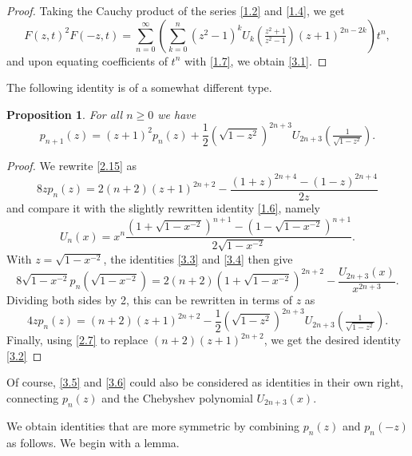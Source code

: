 \documentclass{amsart}
\theoremstyle{plain}
\newtheorem{proposition}[theorem]{Proposition}
\numberwithin{equation}{section}
\begin{document}
\begin{proof}
Taking the Cauchy product of the series \eqref{1.2} and \eqref{1.4}, we get
\[
F(z,t)^2F(-z,t)=\sum_{n=0}^\infty\left(\sum_{k=0}^n(z^2-1)^k
U_k(\tfrac{z^2+1}{z^2-1})(z+1)^{2n-2k}\right)t^n,
\]
and upon equating coefficients of $t^n$ with \eqref{1.7}, we obtain \eqref{3.1}.
\end{proof}

The following identity is of a somewhat different type.

\begin{proposition}\label{prop:3.2}
For all $n\geq 0$ we have
\begin{equation}\label{3.2}
p_{n+1}(z)=(z+1)^2p_n(z)+\frac{1}{2}\left(\sqrt{1-z^2}\right)^{2n+3}
U_{2n+3}(\tfrac{1}{\sqrt{1-z^2}}).
\end{equation}
\end{proposition}

\begin{proof}
We rewrite \eqref{2.15} as
\begin{equation}\label{3.3}
8zp_n(z)=2(n+2)(z+1)^{2n+2}-\frac{(1+z)^{2n+4}-(1-z)^{2n+4}}{2z}
\end{equation}
and compare it with the slightly rewritten identity \eqref{1.6}, namely
\begin{equation}\label{3.4}
U_n(x)=x^n\frac{\left(1+\sqrt{1-x^{-2}}\right)^{n+1}
-\left(1-\sqrt{1-x^{-2}}\right)^{n+1}}{2\sqrt{1-x^{-2}}}.
\end{equation}
With $z=\sqrt{1-x^{-2}}$, the identities \eqref{3.3} and \eqref{3.4} then give
\begin{equation}\label{3.5}
8\sqrt{1-x^{-2}}p_n(\sqrt{1-x^{-2}})=2(n+2)(1+\sqrt{1-x^{-2}})^{2n+2}
-\frac{U_{2n+3}(x)}{x^{2n+3}}.
\end{equation}
Dividing both sides by 2, this can be rewritten in terms of $z$ as
\begin{equation}\label{3.6}
4zp_n(z)=(n+2)(z+1)^{2n+2}
-\frac{1}{2}\left(\sqrt{1-z^2}\right)^{2n+3}
U_{2n+3}(\tfrac{1}{\sqrt{1-z^2}}).
\end{equation}
Finally, using \eqref{2.7} to replace $(n+2)(z+1)^{2n+2}$, we get the desired
identity \eqref{3.2}
\end{proof}

Of course, \eqref{3.5} and \eqref{3.6} could also be considered as identities
in their own right, connecting $p_n(z)$ and the Chebyshev polynomial
$U_{2n+3}(x)$.

We obtain identities that are more symmetric by combining $p_n(z)$ and 
$p_n(-z)$ as follows. We begin with a lemma.
\end{document}
